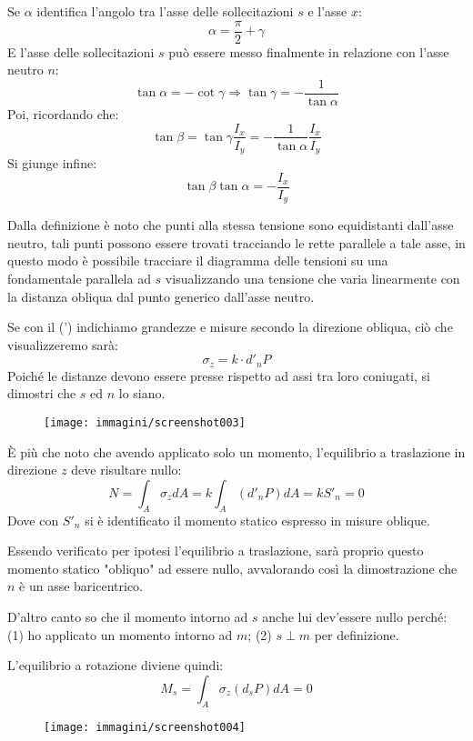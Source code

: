 \documentclass{article}
\begin{document}
\begin{adjustwidth}{2in}{}
		Se $\alpha$ identifica l'angolo tra l'asse delle sollecitazioni $s$ e l'asse $x$:
		\[ \alpha = \dfrac{\pi}{2} + \gamma\]
		E l'asse delle sollecitazioni $s$ può essere messo finalmente in relazione con l'asse neutro $n$: 
		\[ \tan\alpha = -\cot\gamma \Rightarrow \tan\gamma = - \dfrac{1}{\tan\alpha}\]
		Poi, ricordando che: 
		\[ \tan\beta = \tan\gamma \dfrac{I_x}{I_y} = - \dfrac{1}{\tan\alpha} \dfrac{I_x}{I_y}\]
		Si giunge infine:
		\[ \tan\beta\tan\alpha = -\dfrac{I_x}{I_y} \]
		
		Dalla definizione è noto che punti alla stessa tensione sono equidistanti dall'asse neutro, tali punti possono essere trovati tracciando le rette parallele a tale asse, in questo modo è possibile tracciare il diagramma delle tensioni su una fondamentale parallela ad $s$ visualizzando una tensione che varia linearmente con la distanza obliqua dal punto generico dall'asse neutro. 
		
		Se con il (') indichiamo grandezze e misure secondo la direzione obliqua, ciò che visualizzeremo sarà: 
		\[ \sigma_z = k \cdot d'_nP\]
		Poiché le distanze devono essere presse rispetto ad assi tra loro coniugati, si dimostri che $s$ ed $n$ lo siano.

\begin{figure}[H]
	\centering
	\texttt{[image: immagini/screenshot003]}
	\label{fig:screenshot003}
\end{figure}		
		
		È più che noto che avendo applicato solo un momento, l'equilibrio a traslazione in direzione $z$ deve risultare nullo:
		\[ N = \int_A\sigma_zdA = k\int_A(d'_nP)dA= kS'_n = 0\]
		Dove con $S'_n$ si è identificato il momento statico espresso in misure oblique. 
		
		Essendo verificato per ipotesi l'equilibrio a traslazione, sarà proprio questo momento statico "obliquo" ad essere nullo, avvalorando così la dimostrazione che $n$ è un asse baricentrico. \newline 
		
		D'altro canto so che il momento intorno ad $s$ anche lui dev'essere nullo perché: (1) ho applicato un momento intorno ad $m$; (2) $s \perp m$ per definizione. 
		
		L'equilibrio a rotazione diviene quindi: 
		\[ M_s = \int_A\sigma_z(d_sP)dA = 0 \]
		
\begin{figure}[H]
	\centering
	\texttt{[image: immagini/screenshot004]}
	\label{fig:screenshot004}
\end{figure}


\end{adjustwidth}
\end{document}
